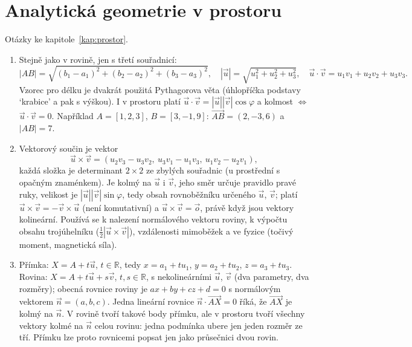 \section{Analytická geometrie v prostoru}

Otázky ke kapitole~\ref{kap:prostor}.

\begin{enumerate}[label=\textbf{\arabic*.}, leftmargin=*, itemsep=0.8em]
  \item {}
  Stejně jako v rovině, jen s třetí souřadnicí:
  \begin{equation*}
    |AB| = \sqrt{{(b_1 - a_1)}^2 + {(b_2 - a_2)}^2 + {(b_3 - a_3)}^2}, \quad |\vec{u}| = \sqrt{u_1^2 + u_2^2 + u_3^2}, \quad \vec{u}\cdot\vec{v} = u_1v_1 + u_2v_2 + u_3v_3.
  \end{equation*}
  Vzorec pro délku je dvakrát použitá Pythagorova věta (úhlopříčka podstavy `krabice' a pak s výškou). I v prostoru platí $\vec{u}\cdot\vec{v} = |\vec{u}||\vec{v}|\cos\varphi$ a kolmost $\Leftrightarrow$ $\vec{u}\cdot\vec{v} = 0$. Například $A = [1, 2, 3]$, $B = [3, -1, 9]$: $\overrightarrow{AB} = (2, -3, 6)$ a $|AB| = 7$. 

  \item {}
  Vektorový součin je vektor
  \begin{equation*}
    \vec{u}\times\vec{v} = (u_2v_3 - u_3v_2,\ u_3v_1 - u_1v_3,\ u_1v_2 - u_2v_1),
  \end{equation*}
  každá složka je determinant $2\times 2$ ze zbylých souřadnic (u prostřední s opačným znaménkem). Je kolmý na $\vec{u}$ i $\vec{v}$, jeho směr určuje pravidlo pravé ruky, velikost je $|\vec{u}||\vec{v}|\sin\varphi$, tedy obsah rovnoběžníku určeného $\vec{u}$, $\vec{v}$; platí $\vec{u}\times\vec{v} = -\vec{v}\times\vec{u}$ (není komutativní) a $\vec{u}\times\vec{v} = \vec{o}$, právě když jsou vektory kolineární. Používá se k nalezení normálového vektoru roviny, k výpočtu obsahu trojúhelníku ($\frac{1}{2}|\vec{u}\times\vec{v}|$), vzdálenosti mimoběžek a ve fyzice (točivý moment, magnetická síla). 

  \item {}
  Přímka: $X = A + t\vec{u}$, $t\in\mathbb{R}$, tedy $x = a_1 + tu_1$, $y = a_2 + tu_2$, $z = a_3 + tu_3$. Rovina: $X = A + t\vec{u} + s\vec{v}$, $t, s\in\mathbb{R}$, s nekolineárními $\vec{u}$, $\vec{v}$ (dva parametry, dva rozměry); obecná rovnice roviny je $ax + by + cz + d = 0$ s normálovým vektorem $\vec{n} = (a, b, c)$. Jedna lineární rovnice $\vec{n}\cdot\overrightarrow{AX} = 0$ říká, že $\overrightarrow{AX}$ je kolmý na $\vec{n}$. V rovině tvoří takové body přímku, ale v prostoru tvoří všechny vektory kolmé na $\vec{n}$ celou rovinu: jedna podmínka ubere jen jeden rozměr ze tří. Přímku lze proto rovnicemi popsat jen jako průsečnici dvou rovin. 


\end{enumerate}

